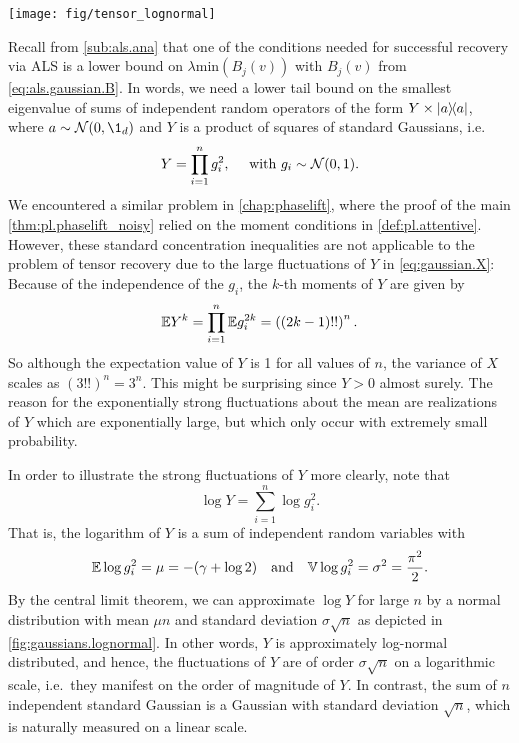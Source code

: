 \begin{figure*}
  \centering
  \texttt{[image: fig/tensor\_lognormal]}
  \caption{%
    Distribution function of $\log X$ given by \cref{eq:gaussian.X} for different numbers of factors $n$.
    The histogram is taken over 100,000 samples and the solid line depicts the probability density function of a normal random variable with mean $\mu n$ and standard deviation $\sigma \sqrt n$.
    Here, $\mu$ and $\sigma$ denotes the mean and standard deviation of $\log g_i^2$ as given by \cref{eq:gaussian.means_and_std}.
    }%
  \label{fig:gaussians.lognormal}
\end{figure*}


Recall from \cref{sub:als.ana} that one of the conditions needed for successful recovery via ALS is a lower bound on $\lambda\mathrm{min}(B_j(v))$ with $B_j(v)$ from \cref{eq:als.gaussian.B}.
In words, we need a lower tail bound on the smallest eigenvalue of sums of independent random operators of the form $Y \times \ketbra{a}$, where $a \sim \Normal(0, \1_d)$ and $Y$ is a product of squares of standard Gaussians, i.e.
\[
  \label{eq:gaussian.X}
  Y = \prod_{i=1}^n g_i^2, \quad\mbox{ with } g_i \sim \mathcal{N}(0, 1).
\]
We encountered a similar problem in \cref{chap:phaselift}, where the proof of the main \cref{thm:pl.phaselift_noisy} relied on the moment conditions in \cref{def:pl.attentive}.
However, these standard concentration inequalities are not applicable to the problem of tensor recovery due to the large fluctuations of $Y$ in \cref{eq:gaussian.X}:
Because of the independence of the $g_i$, the $k$-th moments of $Y$ are given by
\[
  \mathbb{E} Y^k = \prod_{i=1}^n \mathbb{E} g_i^{2k} = \left( (2k - 1)!! \right)^n.
\]
So although the expectation value of $Y$ is 1 for all values of $n$, the variance of $X$ scales as $(3!!)^n = 3^n$.
This might be surprising since $Y > 0$ almost surely.
The reason for the exponentially strong fluctuations about the mean are realizations of $Y$ which are exponentially large, but which only occur with extremely small probability.

In order to illustrate the strong fluctuations of $Y$ more clearly, note that
\[
  \log Y = \sum_{i=1}^n \log g_i^2.
\]
That is, the logarithm of $Y$ is a sum of independent random variables with
\[
  \label{eq:gaussian.means_and_std}
  \mathbb{E} \log g_i^2 = \mu = -(\gamma + \log 2)
  \quad\mbox{and}\quad
  \mathbb{V} \log g_i^2 = \sigma^2 = \frac{\pi^2}{2}.
\]
By the central limit theorem, we can approximate $\log Y$ for large $n$ by a normal distribution with mean $\mu n$ and standard deviation $\sigma \sqrt{n}$ as depicted in \cref{fig:gaussians.lognormal}.
In other words, $Y$ is approximately log-normal distributed, and hence, the fluctuations of $Y$ are of order $\sigma \sqrt{n}$ on a logarithmic scale, i.e.\ they manifest on the order of magnitude of $Y$.
In contrast, the sum of $n$ independent standard Gaussian is a Gaussian with standard deviation $\sqrt{n}$, which is naturally measured on a linear scale.\\



